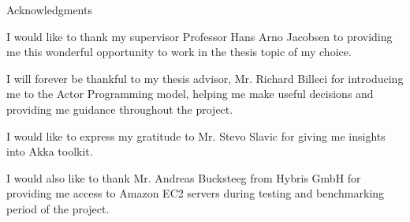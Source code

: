 \thispagestyle{empty}

\vspace*{2cm}

\begin{center}
{ Acknowledgments}
\end{center}

\vspace{1cm}

  I would like to thank my supervisor Professor Hans Arno Jacobsen to providing me this wonderful opportunity to work in the thesis topic of my choice.

  I will forever be thankful to my thesis advisor, Mr. Richard Billeci for introducing me to the Actor Programming model, helping me make useful decisions and providing me guidance throughout the project.

  I would like to express my gratitude to Mr. Stevo Slavic for giving me insights into Akka toolkit.

  I would also like to thank Mr. Andreas Bucksteeg from Hybris GmbH for providing me access to Amazon EC2 servers during testing and benchmarking period of the project.

\cleardoublepage{}

